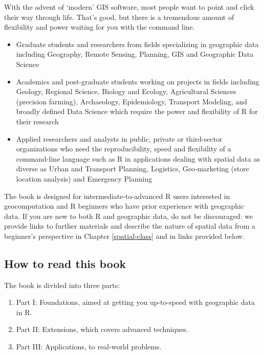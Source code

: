 \documentclass[]{krantz}
\providecommand{\tightlist}{%
  \setlength{\itemsep}{0pt}\setlength{\parskip}{0pt}}
\renewenvironment{quote}{\begin{VF}}{\end{VF}}
\begin{document}
\begin{quote}
With the advent of `modern' GIS software, most people want to point and click their way through life. That's good, but there is a tremendous amount of flexibility and power waiting for you with the command line.
\end{quote}

\begin{itemize}
\tightlist
\item
  Graduate students and researchers from fields specializing in geographic data including Geography, Remote Sensing, Planning, GIS and Geographic Data Science
\item
  Academics and post-graduate students working on projects in fields including Geology, Regional Science, Biology and Ecology, Agricultural Sciences (precision farming), Archaeology, Epidemiology, Transport Modeling, and broadly defined Data Science which require the power and flexibility of R for their research 
\item
  Applied researchers and analysts in public, private or third-sector organizations who need the reproducibility, speed and flexibility of a command-line language such as R in applications dealing with spatial data as diverse as Urban and Transport Planning, Logistics, Geo-marketing (store location analysis) and Emergency Planning 
\end{itemize}

The book is designed for intermediate-to-advanced R users interested in geocomputation and R beginners who have prior experience with geographic data.
If you are new to both R and geographic data, do not be discouraged: we provide links to further materials and describe the nature of spatial data from a beginner's perspective in Chapter \ref{spatial-class} and in links provided below.

\hypertarget{how-to-read-this-book}{%
\subsection*{How to read this book}\label{how-to-read-this-book}}

The book is divided into three parts:

\begin{enumerate}
\def\labelenumi{\arabic{enumi}.}
\tightlist
\item
  Part I: Foundations, aimed at getting you up-to-speed with geographic data in R.
\item
  Part II: Extensions, which covers advanced techniques.
\item
  Part III: Applications, to real-world problems.
\end{enumerate}
\end{document}
